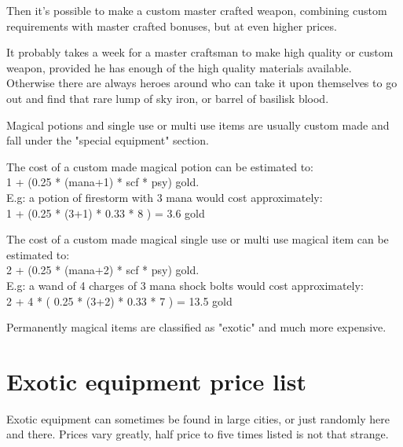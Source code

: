 Then it's possible to make a custom master crafted weapon, combining custom requirements with master crafted bonuses, but at even higher prices.

It probably takes a week for a master craftsman to make high quality or custom weapon, provided he has enough of the high quality materials available. Otherwise there are always heroes around who can take it upon themselves to go out and find that rare lump of sky iron, or barrel of basilisk blood.

Magical potions and single use or multi use items are usually custom made and fall under the "special equipment" section.

The cost of a custom made magical potion can be estimated to:\\
1 + (0.25 * (mana+1) * scf * psy) gold. \\
E.g: a potion of firestorm with 3 mana would cost approximately:\\
1 + (0.25 * (3+1) * 0.33 * 8 ) = 3.6 gold

The cost of a custom made magical single use or multi use magical item can be estimated to: \\
2 + (0.25 * (mana+2) * scf * psy) gold. \\
E.g: a wand of 4 charges of 3 mana shock bolts would cost approximately: \\
2 + 4 * ( 0.25 * (3+2) * 0.33 * 7 ) = 13.5 gold

Permanently magical items are classified as "exotic" and much more expensive.





\pagebreak[1]
\section*{Exotic equipment price list}

Exotic equipment can sometimes be found in large cities, or just randomly here and there. Prices vary greatly, half price to five times listed is not that strange.

